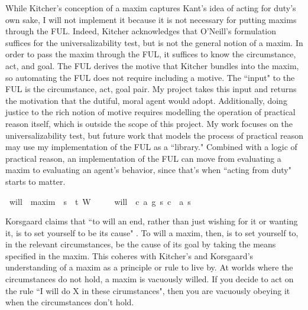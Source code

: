 \begin{isabellebody}
\begin{isamarkuptext}
While Kitcher's conception of a maxim captures Kant's idea of acting for duty's own sake, I will not implement it 
because it is not necessary for putting maxims through the FUL. Indeed, Kitcher acknowledges that 
O'Neill's formulation suffices for the universalizability test, but is not the general notion of a maxim.
In order to pass the maxim through the FUL, it suffices to know the circumstance, act, and goal. The FUL
derives the motive that Kitcher bundles into the maxim, so automating the FUL does not require 
including a motive. The ``input" to the FUL is the circumstance, act, goal pair. My project takes 
this input and returns the motivation that the dutiful, moral agent would adopt. Additionally, doing
justice to the rich notion of motive requires modelling the operation of practical reason itself, 
which is outside the scope of this project. My work focuses on the universalizability test, but future work that 
models the process of practical reason may use my implementation of the FUL as a ``library." Combined 
with a logic of practical reason, an implementation of the FUL can move from evaluating a maxim to 
evaluating an agent's behavior, since that's when ``acting from duty" starts to matter.%
\end{isamarkuptext}\isamarkuptrue%
\isamarkupfalse%
\ will\ {\isacharcolon}{\isacharcolon}\ {\isachardoublequoteopen}maxim\ {\isasymRightarrow}\ s{\isasymRightarrow}\ \ t{\isachardoublequoteclose}\ {\isacharparenleft}{\isachardoublequoteopen}W\ {\isacharunderscore}\ {\isacharunderscore}{\isachardoublequoteclose}{\isacharparenright}\isanewline
\ \ \ {\isachardoublequoteopen}will\ {\isasymequiv}\ {\isasymlambda}{\isacharparenleft}c{\isacharcomma}\ a{\isacharcomma}\ g{\isacharparenright}\ s{\isachardot}\ {\isacharparenleft}c\ \isactrlbold {\isasymrightarrow}\ {\isacharparenleft}a\ s{\isacharparenright}{\isacharparenright}{\isachardoublequoteclose}\isanewline
{}\isamarkupfalse%
%
\begin{isamarkuptext}%
Korsgaard claims that ``to will an end, rather than just
wishing for it or wanting it, is to set yourself to be its cause" \cite{sources}. To will a maxim, then, 
is to set yourself to, in the relevant circumstances, be the cause of its goal by taking the means 
specified in the maxim. This coheres with 
Kitcher's and Korsgaard's understanding of a maxim as a principle or rule to live by. At worlds 
where the circumstances do not hold, a maxim is vacuously willed. If you decide to act on the rule ``I will 
do X in these cirumstances", then you are vacuously obeying it when the circumstances don't hold.  


\end{isamarkuptext}
\end{isabellebody}
